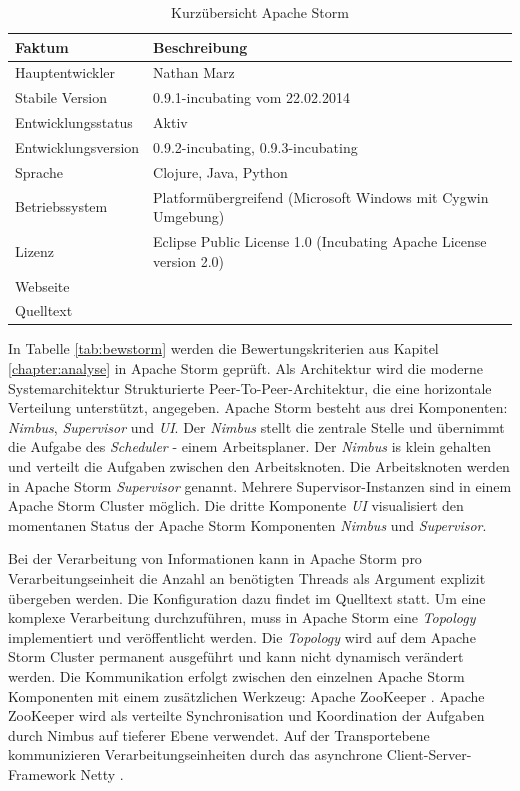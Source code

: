 \begin{table}[htbp]
	\centering
		\begin{tabular}{@{}ll@{}} \toprule
			\textbf{Faktum} & \textbf{Beschreibung} \\ \midrule
			Hauptentwickler & Nathan Marz \\
			Stabile Version & 0.9.1-incubating vom 22.02.2014 \\ 
			Entwicklungsstatus &  Aktiv \\
			Entwicklungsversion & 0.9.2-incubating, 0.9.3-incubating \\
			Sprache & Clojure, Java, Python \\
			Betriebssystem & Platformübergreifend (Microsoft Windows mit Cygwin Umgebung) \\
			Lizenz & Eclipse Public License 1.0 (Incubating Apache License version 2.0) \\
			Webseite &  \citeint{storm:home} \\
			Quelltext & \citeint{storm:GitHubApacheMirror} \\			
			\bottomrule			
		\end{tabular}
	\caption{Kurzübersicht Apache Storm}
	\label{tab:vorstorm}
\end{table}

In Tabelle \ref{tab:bewstorm} werden die Bewertungskriterien aus Kapitel \ref{chapter:analyse} in Apache Storm geprüft. Als Architektur wird die moderne Systemarchitektur Strukturierte Peer-To-Peer-Architektur, die eine horizontale Verteilung unterstützt, angegeben. Apache Storm besteht aus drei Komponenten: \textit{Nimbus}, \textit{Supervisor} und \textit{UI}. Der \textit{Nimbus} stellt die zentrale Stelle und übernimmt die Aufgabe des \textit{Scheduler} - einem Arbeitsplaner. Der \textit{Nimbus} is klein gehalten und verteilt die Aufgaben zwischen den Arbeitsknoten. Die Arbeitsknoten werden in Apache Storm \textit{Supervisor} genannt. Mehrere Supervisor-Instanzen sind in einem Apache Storm Cluster möglich. Die dritte Komponente \textit{UI} visualisiert den momentanen Status der Apache Storm Komponenten \textit{Nimbus} und \textit{Supervisor}. 

Bei der Verarbeitung von Informationen kann in Apache Storm pro Verarbeitungseinheit die Anzahl an benötigten Threads als Argument explizit übergeben werden. Die Konfiguration dazu findet im Quelltext statt. Um eine komplexe Verarbeitung durchzuführen, muss in Apache Storm eine \textit{Topology} implementiert und veröffentlicht werden. Die \textit{Topology} wird auf dem Apache Storm Cluster permanent ausgeführt und kann nicht dynamisch verändert werden. Die Kommunikation erfolgt zwischen den einzelnen Apache Storm Komponenten mit einem zusätzlichen Werkzeug: Apache ZooKeeper . Apache ZooKeeper wird als verteilte Synchronisation und Koordination der Aufgaben durch Nimbus auf tieferer Ebene verwendet. Auf der Transportebene kommunizieren Verarbeitungseinheiten durch das asynchrone Client-Server-Framework Netty .

